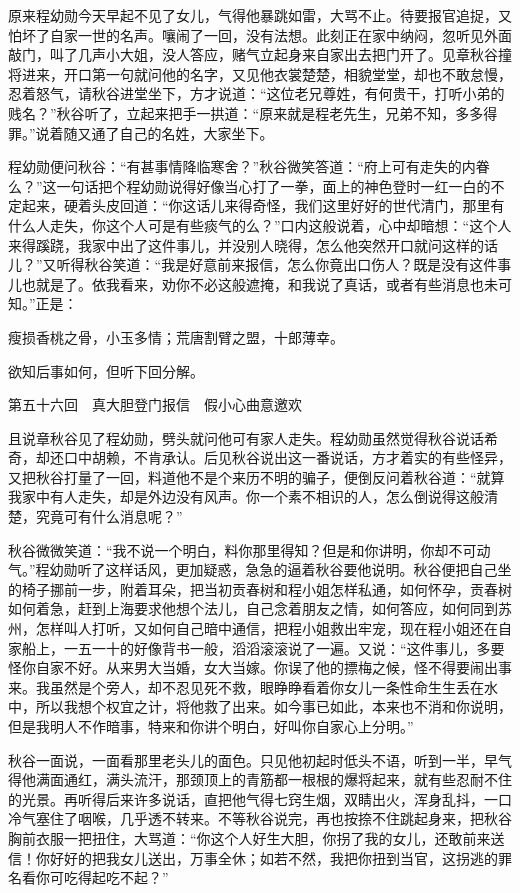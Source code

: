 \documentclass[12pt,UTF8]{ctexbook}
\begin{document}
{{{原来程幼勋今天早起不见了女儿，气得他暴跳如雷，大骂不止。待要报官追捉，又怕坏了自家一世的名声。嚷闹了一回，没有法想。此刻正在家中纳闷，忽听见外面敲门，叫了几声小大姐，没人答应，赌气立起身来自家出去把门开了。见章秋谷撞将进来，开口第一句就问他的名字，又见他衣裳楚楚，相貌堂堂，却也不敢怠慢，忍着怒气，请秋谷进堂坐下，方才说道：“这位老兄尊姓，有何贵干，打听小弟的贱名？”秋谷听了，立起来把手一拱道：“原来就是程老先生，兄弟不知，多多得罪。”说着随又通了自己的名姓，大家坐下。

程幼勋便问秋谷：“有甚事情降临寒舍？”秋谷微笑答道：“府上可有走失的内眷么？”这一句话把个程幼勋说得好像当心打了一拳，面上的神色登时一红一白的不定起来，硬着头皮回道：“你这话儿来得奇怪，我们这里好好的世代清门，那里有什么人走失，你这个人可是有些痰气的么？”口内这般说着，心中却暗想：“这个人来得蹊跷，我家中出了这件事儿，并没别人晓得，怎么他突然开口就问这样的话儿？”又听得秋谷笑道：“我是好意前来报信，怎么你竟出口伤人？既是没有这件事儿也就是了。依我看来，劝你不必这般遮掩，和我说了真话，或者有些消息也未可知。”正是：

瘦损香桃之骨，小玉多情；荒唐割臂之盟，十郎薄幸。

欲知后事如何，但听下回分解。





第五十六回　真大胆登门报信　假小心曲意邀欢





且说章秋谷见了程幼勋，劈头就问他可有家人走失。程幼勋虽然觉得秋谷说话希奇，却还口中胡赖，不肯承认。后见秋谷说出这一番说话，方才着实的有些怪异，又把秋谷打量了一回，料道他不是个来历不明的骗子，便倒反问着秋谷道：“就算我家中有人走失，却是外边没有风声。你一个素不相识的人，怎么倒说得这般清楚，究竟可有什么消息呢？”

秋谷微微笑道：“我不说一个明白，料你那里得知？但是和你讲明，你却不可动气。”程幼勋听了这样话风，更加疑惑，急急的逼着秋谷要他说明。秋谷便把自己坐的椅子挪前一步，附着耳朵，把当初贡春树和程小姐怎样私通，如何怀孕，贡春树如何着急，赶到上海要求他想个法儿，自己念着朋友之情，如何答应，如何同到苏州，怎样叫人打听，又如何自己暗中通信，把程小姐救出牢宠，现在程小姐还在自家船上，一五一十的好像背书一般，滔滔滚滚说了一遍。又说：“这件事儿，多要怪你自家不好。从来男大当婚，女大当嫁。你误了他的摽梅之候，怪不得要闹出事来。我虽然是个旁人，却不忍见死不救，眼睁睁看着你女儿一条性命生生丢在水中，所以我想个权宜之计，将他救了出来。如今事已如此，本来也不消和你说明，但是我明人不作暗事，特来和你讲个明白，好叫你自家心上分明。”

秋谷一面说，一面看那里老头儿的面色。只见他初起时低头不语，听到一半，早气得他满面通红，满头流汗，那颈顶上的青筋都一根根的爆将起来，就有些忍耐不住的光景。再听得后来许多说话，直把他气得七窍生烟，双睛出火，浑身乱抖，一口冷气塞住了咽喉，几乎透不转来。不等秋谷说完，再也按捺不住跳起身来，把秋谷胸前衣服一把扭住，大骂道：“你这个人好生大胆，你拐了我的女儿，还敢前来送信！你好好的把我女儿送出，万事全休；如若不然，我把你扭到当官，这拐逃的罪名看你可吃得起吃不起？”

}}}
\end{document}
